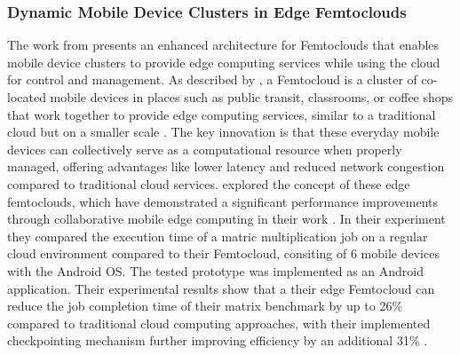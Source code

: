 \subsubsection{Dynamic Mobile Device Clusters in Edge Femtoclouds}
The work from \citeauthor{relatedwork:mobilecloud} \cite{relatedwork:mobilecloud} presents an enhanced architecture for Femtoclouds that enables mobile device clusters to provide edge computing services while using the cloud for control and management. As described by \citeauthor{relatedwork:mobilecloud}, a Femtocloud is a cluster of co-located mobile devices in places such as public transit, classrooms, or coffee shops that work together to provide edge computing services, similar to a traditional cloud but on a smaller scale \cite{relatedwork:mobilecloud}. The key innovation is that these everyday mobile devices can collectively serve as a computational resource when properly managed, offering advantages like lower latency and reduced network congestion compared to traditional cloud services. \citeauthor{relatedwork:mobilecloud} explored the concept of these edge femtoclouds, which have demonstrated a significant performance improvements through collaborative mobile edge computing in their work \cite{relatedwork:mobilecloud}. In their experiment they compared the execution time of a matric multiplication job on a regular cloud environment compared to their Femtocloud, consiting of 6 mobile devices with the Android \ac{OS}. The tested prototype was implemented as an Android application. Their experimental results show that a their edge Femtocloud can reduce the job completion time of their matrix benchmark by up to 26\% compared to traditional cloud computing approaches, with their implemented checkpointing mechanism further improving efficiency by an additional 31\% \cite{relatedwork:mobilecloud}. 

